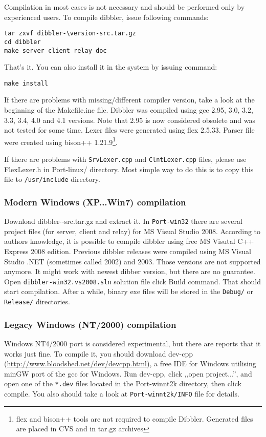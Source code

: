 Compilation in most cases is not necessary and should be performed
only by experienced users. To compile dibbler, issue following commands:
\begin{verbatim}
tar zxvf dibbler-\version-src.tar.gz
cd dibbler
make server client relay doc
\end{verbatim}
That's it. You can also install it in the system by issuing command:

\begin{verbatim}
make install
\end{verbatim}

If there are problems with missing/different compiler
version, take a look at the beginning of the Makefile.inc
file. Dibbler was compiled using gcc 2.95, 3.0, 3.2, 3.3, 3.4, 4.0 and 4.1
versions. Note that 2.95 is now considered obsolete and was not tested
for some time. Lexer files were generated using flex 2.5.33. Parser file
were created using bison++ 1.21.9\footnote{flex and bison++ tools are
  not required to compile Dibbler. Generated files are placed in CVS
  and in tar.gz archives}.

If there are problems with \verb+SrvLexer.cpp+ and
\verb+ClntLexer.cpp+ files, please use FlexLexer.h in Port-linux/
directory. Most simple way to do this is to copy this file to
\verb+/usr/include+ directory.

\subsubsection{Modern Windows (XP...Win7) compilation}
Download dibbler-\version-src.tar.gz and extract it. In
\verb+Port-win32+ there are several project files (for server, client
and relay) for MS Visual Studio 2008. According to authors knowledge,
it is possible to compile dibbler using free MS Visutal C++ Express
2008 edition. Previous dibbler releases were compiled using MS Visual
Studio .NET (sometimes called 2002) and 2003. Those versions are not
supported anymore. It might work with newest dibber version, but there
are no guarantee. Open \verb+dibbler-win32.vs2008.sln+ solution file
click Build command. That should start compilation. After a while,
binary exe files will be stored in the \verb+Debug/+ or
\verb+Release/+ directories.

\subsubsection{Legacy Windows (NT/2000) compilation}
Windows NT4/2000 port is considered experimental, but there are reports
that it works just fine. To compile it, you should download dev-cpp
(\url{http://www.bloodshed.net/dev/devcpp.html}), a free IDE for
Windows utilising minGW port of the gcc for Windows. Run dev-cpp,
click ,,open project...'', and open one of the \verb+*.dev+ files located
in the Port-winnt2k directory, then click compile. You also should
take a look at \verb+Port-winnt2k/INFO+ file for details.

